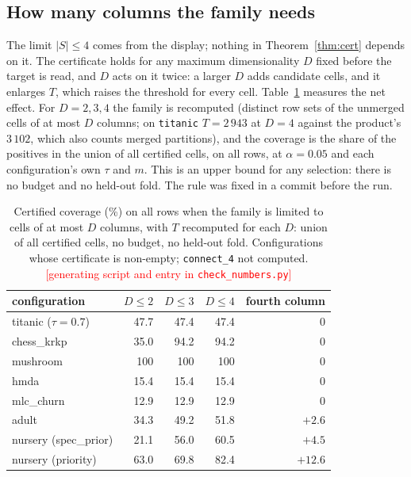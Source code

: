 \documentclass[11pt]{article}
\newcommand{\todo}[1]{\textcolor{red}{[#1]}}
\begin{document}
\subsection{How many columns the family needs}\label{sec:maxd}
The limit $|S|\le4$ comes from the display; nothing in Theorem~\ref{thm:cert} depends on it. The certificate holds for any maximum dimensionality $D$ fixed before the target is read, and $D$ acts on it twice: a larger $D$ adds candidate cells, and it enlarges $T$, which raises the threshold for every cell. Table~\ref{tab:maxd} measures the net effect. For $D=2,3,4$ the family is recomputed (distinct row sets of the unmerged cells of at most $D$ columns; on \texttt{titanic} $T=2\,943$ at $D=4$ against the product's $3\,102$, which also counts merged partitions), and the coverage is the share of the positives in the union of all certified cells, on all rows, at $\alpha=0.05$ and each configuration's own $\tau$ and $m$. This is an upper bound for any selection: there is no budget and no held-out fold. The rule was fixed in a commit before the run.

\begin{table}[t]\centering\small
\caption{Certified coverage (\%) on all rows when the family is limited to cells of at most $D$ columns, with $T$ recomputed for each $D$: union of all certified cells, no budget, no held-out fold. Configurations whose certificate is non-empty; \texttt{connect\_4} not computed. \todo{generating script and entry in \texttt{check\_numbers.py}}}\label{tab:maxd}
\begin{tabular}{lrrrr}
\toprule
configuration & $D\le2$ & $D\le3$ & $D\le4$ & fourth column\\
\midrule
titanic ($\tau=0.7$) & 47.7 & 47.4 & 47.4 & 0\\
chess\_krkp & 35.0 & 94.2 & 94.2 & 0\\
mushroom & 100 & 100 & 100 & 0\\
hmda & 15.4 & 15.4 & 15.4 & 0\\
mlc\_churn & 12.9 & 12.9 & 12.9 & 0\\
adult & 34.3 & 49.2 & 51.8 & $+2.6$\\
nursery (spec\_prior) & 21.1 & 56.0 & 60.5 & $+4.5$\\
nursery (priority) & 63.0 & 69.8 & 82.4 & $+12.6$\\
\bottomrule
\end{tabular}
\end{table}
\end{document}
